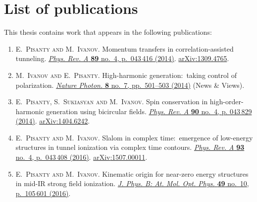 







\chapter*{List of publications}



This thesis contains work that appears in the following publications:



\begin{enumerate}
\item[{\hypersetup{citecolor=black}\cite{Pisanty_momentum_transfers_2014}}]
\textsc{E.~Pisanty and M.~Ivanov}.
\newblock Momentum transfers in correlation-assisted
  tunneling.
\newblock \href{http://dx.doi.org/10.1103/PhysRevA.89.043416}{
          \emph{Phys. Rev. A} \textbf{89} no.~4, p.~043\,416 (2014)}.
\newblock \href{http://arxiv.org/abs/1309.4765}{{arXiv}:1309.4765}.

\item[{\hypersetup{citecolor=black}\cite{Ivanov_nature_photonics_2014}}]
\textsc{M.~Ivanov and E.~Pisanty}.
\newblock High-harmonic generation:\ taking control of polarization.
\newblock \href{http://dx.doi.org/10.1038/nphoton.2014.141}{
          \emph{Nature Photon.} \textbf{8} no.~7, pp.~501--503 (2014)} (News \& Views).

\item[{\hypersetup{citecolor=black}\cite{Pisanty_spin_conservation_2014}}]
\textsc{E.~Pisanty, S.~Sukiasyan and M.~Ivanov}.
\newblock Spin conservation in high-order-harmonic generation using bicircular fields. 
\newblock \href{http://dx.doi.org/10.1103/PhysRevA.90.043829}{
          \emph{Phys. Rev. A} \textbf{90} no.~4, p. 043\,829 (2014)}.
\newblock \href{http://arxiv.org/abs/1404.6242}{{arXiv}:1404.6242}.

\item[{\hypersetup{citecolor=black}\cite{Pisanty_slalom_2016}}]
\textsc{E.~Pisanty and M.~Ivanov}.
\newblock Slalom in complex time:\ emergence of low-energy structures in tunnel
  ionization via complex time contours.
\newblock \href{http://dx.doi.org/10.1103/PhysRevA.93.043408}{
          \emph{Phys. Rev. A} \textbf{93} no.~4, p.~043\,408 (2016)}.
\newblock \href{http://arxiv.org/abs/1507.00011}{{arXiv}:1507.00011}.

\item[{\hypersetup{citecolor=black}\cite{Pisanty_kinematic_2016}}]
\textsc{E.~Pisanty and M.~Ivanov}.
\newblock Kinematic origin for near-zero energy structures in mid-{IR} strong field ionization.
\newblock \href{http://dx.doi.org/10.1088/0953-4075/49/10/105601}{
          \emph{J. Phys. B: At. Mol. Opt. Phys.} \textbf{49} no.~10, p.~105\,601 (2016)}.


\end{enumerate}

